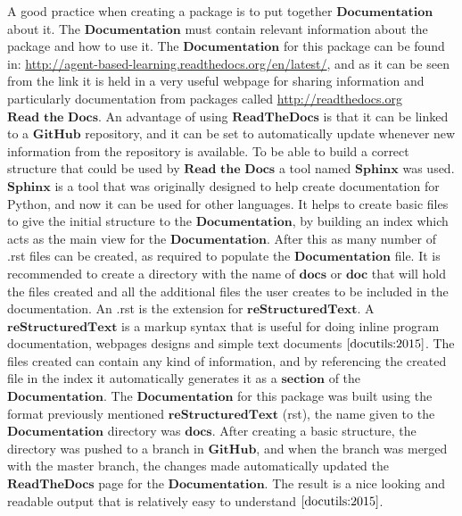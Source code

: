 A good practice when creating a package is to put together $\textbf{Documentation}$ about it. The $\textbf{Documentation}$ must contain relevant information about the package and how to use it. The $\textbf{Documentation}$ for this package can be found in:  \url{http://agent-based-learning.readthedocs.org/en/latest/}, and as it can be seen from the link it is held in a very useful webpage for sharing information and particularly documentation from packages called \url{http://readthedocs.org} $\textbf{Read the Docs}$. An advantage of using $\textbf{ReadTheDocs}$ is that it can be linked to a $\textbf{GitHub}$ repository, and it can be set to automatically update whenever new information from the repository is available.  To be able to build a correct structure that could be used by $\textbf{Read the Docs}$ a tool named  $\textbf{Sphinx}$ was used. $\textbf{Sphinx}$ is a tool that was originally designed to help create documentation for Python, and now it can be used for other languages. It helps to create basic files to give the initial structure to the $\textbf{Documentation}$, by building an index which acts as the main view for the $\textbf{Documentation}$. After this as many number of .rst files can be created, as required to populate the $\textbf{Documentation}$ file. It is recommended to create a directory with the name of $\textbf{docs}$ or $\textbf{doc}$ that will hold the files created and all the additional files the user creates to be included in the documentation. An .rst is the extension  for  $\textbf{reStructuredText}$. A $\textbf{reStructuredText}$ is a markup syntax that is useful for doing inline program documentation, webpages designs and simple text documents $\cite{docutils:2015}$. The files created can contain any kind of information, and by referencing the created file in the index it automatically generates it as a $\textbf{section}$ of the $\textbf{Documentation}$. 
The  $\textbf{Documentation}$ for this package was built using the format previously mentioned $\textbf{reStructuredText}$ (rst), the name given to the $\textbf{Documentation}$ directory was $\textbf{docs}$. After creating a basic structure, the directory was pushed to a branch in $\textbf{GitHub}$, and when the branch was merged with the master branch, the changes made automatically updated the $\textbf{ReadTheDocs}$ page for the $\textbf{Documentation}$. The result is a nice looking and readable output that is relatively easy to understand $\cite{docutils:2015}$. 
